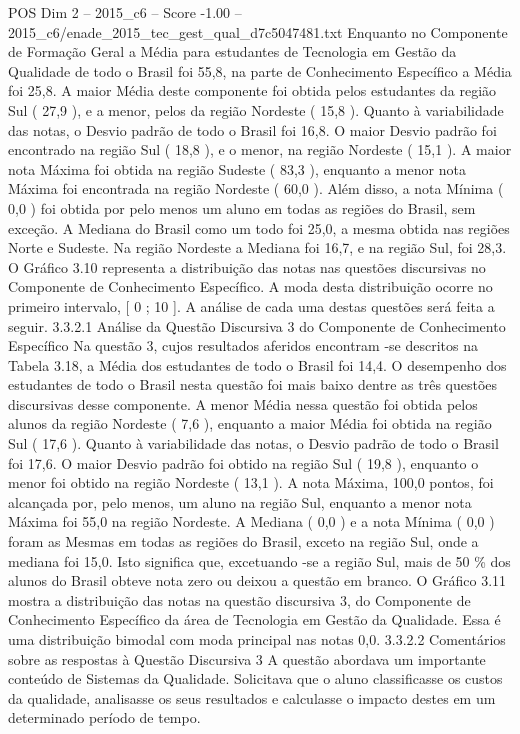 \begin{textsample}{POS Dim 2 – 2015\_c6 – Score -1.00 – 2015\_c6/enade\_2015\_tec\_gest\_qual\_d7c5047481.txt}
Enquanto no Componente de Formação Geral a Média para estudantes de Tecnologia em Gestão da Qualidade de todo o Brasil foi 55,8, na parte de Conhecimento Específico a Média foi 25,8.
A maior Média deste componente foi obtida pelos estudantes da região Sul ( 27,9 ), e a menor, pelos da região Nordeste ( 15,8 ).
Quanto à variabilidade das notas, o Desvio padrão de todo o Brasil foi 16,8.
O maior Desvio padrão foi encontrado na região Sul ( 18,8 ), e o menor, na região Nordeste ( 15,1 ).
A maior nota Máxima foi obtida na região Sudeste ( 83,3 ), enquanto a menor nota Máxima foi encontrada na região Nordeste ( 60,0 ).
Além disso, a nota Mínima ( 0,0 ) foi obtida por pelo menos um aluno em todas as regiões do Brasil, sem exceção.
A Mediana do Brasil como um todo foi 25,0, a mesma obtida nas regiões Norte e Sudeste.
Na região Nordeste a Mediana foi 16,7, e na região Sul, foi 28,3.
O Gráfico 3.10 representa a distribuição das notas nas questões discursivas no Componente de Conhecimento Específico.
A moda desta distribuição ocorre no primeiro intervalo, [ 0 ; 10 ].
A análise de cada uma destas questões será feita a seguir. 3.3.2.1 Análise da Questão Discursiva 3 do Componente de Conhecimento Específico Na questão 3, cujos resultados aferidos encontram -se descritos na Tabela 3.18, a Média dos estudantes de todo o Brasil foi 14,4.
O desempenho dos estudantes de todo o Brasil nesta questão foi mais baixo dentre as três questões discursivas desse componente.
A menor Média nessa questão foi obtida pelos alunos da região Nordeste ( 7,6 ), enquanto a maior Média foi obtida na região Sul ( 17,6 ).
Quanto à variabilidade das notas, o Desvio padrão de todo o Brasil foi 17,6.
O maior Desvio padrão foi obtido na região Sul ( 19,8 ), enquanto o menor foi obtido na região Nordeste ( 13,1 ).
A nota Máxima, 100,0 pontos, foi alcançada por, pelo menos, um aluno na região Sul, enquanto a menor nota Máxima foi 55,0 na região Nordeste.
A Mediana ( 0,0 ) e a nota Mínima ( 0,0 ) foram as Mesmas em todas as regiões do Brasil, exceto na região Sul, onde a mediana foi 15,0.
Isto significa que, excetuando -se a região Sul, mais de 50 \% dos alunos do Brasil obteve nota zero ou deixou a questão em branco.
O Gráfico 3.11 mostra a distribuição das notas na questão discursiva 3, do Componente de Conhecimento Específico da área de Tecnologia em Gestão da Qualidade.
Essa é uma distribuição bimodal com moda principal nas notas 0,0. 3.3.2.2 Comentários sobre as respostas à Questão Discursiva 3 A questão abordava um importante conteúdo de Sistemas da Qualidade.
Solicitava que o aluno classificasse os custos da qualidade, analisasse os seus resultados e calculasse o impacto destes em um determinado período de tempo.

\end{textsample}
